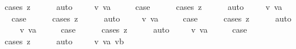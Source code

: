 \begin{isabellebody}
\ {\isacharparenleft}cases\ z{\isacharparenright}\isanewline
\ \ \ \ \isamarkupfalse%
\ auto\isanewline
{}\isamarkupfalse%
\isanewline
\ \ \isamarkupfalse%
\ {\isacharparenleft}{}\ v\ va{\isacharparenright}\isanewline
\ \ \isamarkupfalse%
\ \isamarkupfalse%
\ {\isacharquery}case\isanewline
\ \ \ \ \isamarkupfalse%
\ {\isacharparenleft}cases\ z{\isacharparenright}\isanewline
\ \ \ \ \isamarkupfalse%
\ auto\isanewline
{}\isamarkupfalse%
\isanewline
\ \ \isamarkupfalse%
\ {\isacharparenleft}{}\ v\ va{\isacharparenright}\isanewline
\ \ \isamarkupfalse%
\ \isamarkupfalse%
\ {\isacharquery}case\isanewline
\ \ \ \ \isamarkupfalse%
\ {\isacharparenleft}cases\ z{\isacharparenright}\isanewline
\ \ \ \ \isamarkupfalse%
\ auto\isanewline
{}\isamarkupfalse%
\isanewline
\ \ \isamarkupfalse%
\ {\isacharparenleft}{\isachardoublequoteopen}{}{\isacharunderscore}{}{\isachardoublequoteclose}\ v\ va{\isacharparenright}\isanewline
\ \ \isamarkupfalse%
\ \isamarkupfalse%
\ {\isacharquery}case\isanewline
\ \ \ \ \isamarkupfalse%
\ {\isacharparenleft}cases\ z{\isacharparenright}\isanewline
\ \ \ \ \isamarkupfalse%
\ auto\isanewline
{}\isamarkupfalse%
\isanewline
\ \ \isamarkupfalse%
\ {\isacharparenleft}{\isachardoublequoteopen}{}{\isacharunderscore}{}{\isachardoublequoteclose}\ v\ va{\isacharparenright}\isanewline
\ \ \isamarkupfalse%
\ \isamarkupfalse%
\ {\isacharquery}case\isanewline
\ \ \ \ \isamarkupfalse%
\ {\isacharparenleft}cases\ z{\isacharparenright}\isanewline
\ \ \ \ \isamarkupfalse%
\ auto\isanewline
{}\isamarkupfalse%
\isanewline
\ \ \isamarkupfalse%
\ {\isacharparenleft}{\isachardoublequoteopen}{}{\isacharunderscore}{}{\isachardoublequoteclose}\ v\ va{\isacharparenright}\isanewline
\ \ \isamarkupfalse%
\ \isamarkupfalse%
\ {\isacharquery}case\isanewline
\ \ \ \ \isamarkupfalse%
\ {\isacharparenleft}cases\ z{\isacharparenright}\isanewline
\ \ \ \ \isamarkupfalse%
\ auto\isanewline
{}\isamarkupfalse%
\isanewline
\ \ \isamarkupfalse%
\ {\isacharparenleft}{\isachardoublequoteopen}{}{\isacharunderscore}{}{\isachardoublequoteclose}\ v\ va\ vb{\isacharparenright}\isanewline

\end{isabellebody}
